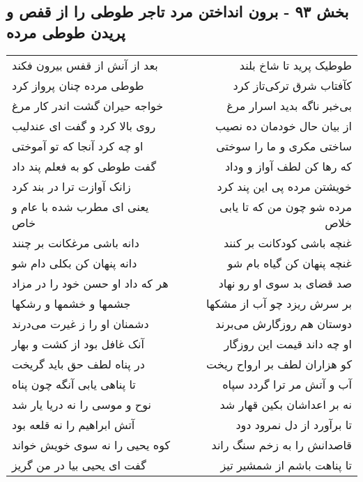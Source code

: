 \begin{center}
\section*{بخش ۹۳ - برون انداختن مرد تاجر طوطی را از قفص و پریدن طوطی مرده}
\label{sec:sh093}
\begin{longtable}{l p{0.5cm} r}
بعد از آنش از قفس بیرون فکند
&&
طوطیک پرید تا شاخ بلند
\\
طوطی مرده چنان پرواز کرد
&&
کآفتاب شرق ترکی‌تاز کرد
\\
خواجه حیران گشت اندر کار مرغ
&&
بی‌خبر ناگه بدید اسرار مرغ
\\
روی بالا کرد و گفت ای عندلیب
&&
از بیان حال خودمان ده نصیب
\\
او چه کرد آنجا که تو آموختی
&&
ساختی مکری و ما را سوختی
\\
گفت طوطی کو به فعلم پند داد
&&
که رها کن لطف آواز و وداد
\\
زانک آوازت ترا در بند کرد
&&
خویشتن مرده پی این پند کرد
\\
یعنی ای مطرب شده با عام و خاص
&&
مرده شو چون من که تا یابی خلاص
\\
دانه باشی مرغکانت بر چنند
&&
غنچه باشی کودکانت بر کنند
\\
دانه پنهان کن بکلی دام شو
&&
غنچه پنهان کن گیاه بام شو
\\
هر که داد او حسن خود را در مزاد
&&
صد قضای بد سوی او رو نهاد
\\
جشمها و خشمها و رشکها
&&
بر سرش ریزد چو آب از مشکها
\\
دشمنان او را ز غیرت می‌درند
&&
دوستان هم روزگارش می‌برند
\\
آنک غافل بود از کشت و بهار
&&
او چه داند قیمت این روزگار
\\
در پناه لطف حق باید گریخت
&&
کو هزاران لطف بر ارواح ریخت
\\
تا پناهی یابی آنگه چون پناه
&&
آب و آتش مر ترا گردد سپاه
\\
نوح و موسی را نه دریا یار شد
&&
نه بر اعداشان بکین قهار شد
\\
آتش ابراهیم را نه قلعه بود
&&
تا برآورد از دل نمرود دود
\\
کوه یحیی را نه سوی خویش خواند
&&
قاصدانش را به زخم سنگ راند
\\
گفت ای یحیی بیا در من گریز
&&
تا پناهت باشم از شمشیر تیز
\\
\end{longtable}
\end{center}
